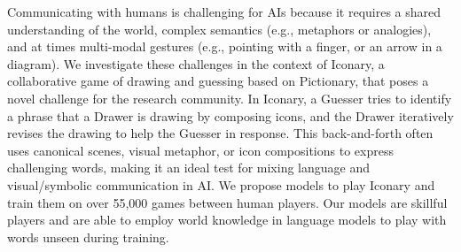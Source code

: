 Communicating with humans is challenging for AIs because it requires a shared understanding of the world, complex semantics (e.g., metaphors or analogies), and at times multi-modal gestures (e.g., pointing with a  finger, or an arrow in a diagram). We investigate these challenges in the context of Iconary, a collaborative game of drawing and guessing based on Pictionary, that poses a novel challenge for the research community. In Iconary, a Guesser tries to identify a phrase that a Drawer is drawing by composing icons, and the Drawer iteratively revises the drawing to help the Guesser in response. This back-and-forth often uses canonical scenes, visual metaphor, or icon compositions to express challenging words, making it an ideal test for mixing language and visual/symbolic communication in AI. We propose models to play Iconary and train them on over 55,000 games between human players. Our models are skillful players and are able to employ world knowledge in language models to play with words unseen during training.
